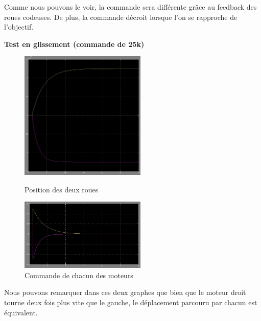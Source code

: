 Comme nous pouvons le voir, la commande sera différente grâce au feedback des roues codeuses. De plus, la commande décroit lorsque l'on se rapproche de l'objectif.
\hfill \\

\begin{center}
\textbf{Test en glissement (commande de 25k)}
\end{center}

\begin{figure}[ht!]
    \begin{minipage}[b]{0.4\linewidth}
        \centering 
        \includegraphics[width=6cm]{glisPos.JPG}
        \caption{Position des deux roues}
    \end{minipage}\hfill
    \begin{minipage}[b]{0.48\linewidth}
        \centering \includegraphics[width=6cm]{glisCMD.JPG}
        \caption{Commande de chacun des moteurs}
    \end{minipage}
\end{figure}

Nous pouvons remarquer dans ces deux graphes que bien que le moteur droit tourne deux fois plus vite que le gauche, le déplacement parcouru par chacun est équivalent.
